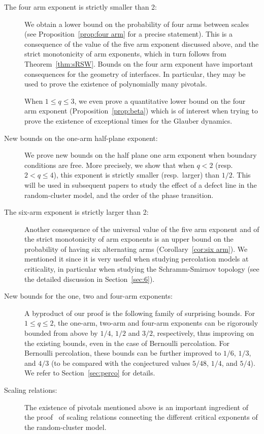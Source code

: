 \documentclass[a4paper,oneside,11pt]{article}
\numberwithin{equation}{section}
\numberwithin{equation}{section}
\numberwithin{equation}{section}
\begin{document}
\begin{description}
\item[The four arm exponent is strictly smaller than 2:] 
We obtain a lower bound on the probability of four arms between scales (see Proposition~\ref{prop:four arm} for a precise statement).
This is a consequence of the value of the five arm exponent discussed above, and the strict monotonicity of arm exponents, which in turn follows from Theorem~\ref{thm:sRSW}.
Bounds on the four arm exponent have important consequences for the geometry of interfaces. 
In particular, they may be used to prove the existence of polynomially many pivotals.

When $1\le q\le 3$, we even prove a quantitative lower bound on the four arm exponent  (Proposition~\ref{prop:beta}) which is of interest when trying to prove the existence of exceptional times for the Glauber dynamics.  

\item[New bounds on the one-arm half-plane exponent:] We prove new bounds on the half plane one arm exponent when boundary conditions are free. More precisely, we show that when $q<2$ (resp.~$2<q\le 4$), this exponent is strictly smaller (resp.~larger) than $1/2$. This will be used in subsequent papers to study the effect of a defect line in the random-cluster model, and the order of the phase transition.

\item[The six-arm exponent is strictly larger than 2:] 
Another consequence of the universal value of the five arm exponent and of the strict monotonicity of arm exponents is 
an upper bound on the probability of having six alternating arms (Corollary~\ref{cor:six arm}). We mentioned it since it is very useful when studying percolation models at criticality, in particular when studying the Schramm-Smirnov topology \cite{SchSmi11} (see the detailed discussion in Section~\ref{sec:6}).

\item[New bounds for the one, two and four-arm exponents:] 
A byproduct of our proof is the following family of surprising bounds.
For $1\le q\le2$, the one-arm, two-arm and four-arm exponents can be rigorously bounded from above by $1/4$, $1/2$ and $3/2$, respectively, thus improving on the existing bounds, even in the case of Bernoulli percolation. For Bernoulli percolation, these bounds can be further improved to $1/6$, $1/3$, and $4/3$ (to be compared with the conjectured values $5/48$, $1/4$, and $5/4$). We refer to Section~\ref{sec:perco} for details.
\item[Scaling relations:] 
The existence of pivotals mentioned above is an important ingredient of the proof~\cite{DumMan20} of scaling relations connecting the different critical exponents of the random-cluster model.
\end{description}
\end{document}
